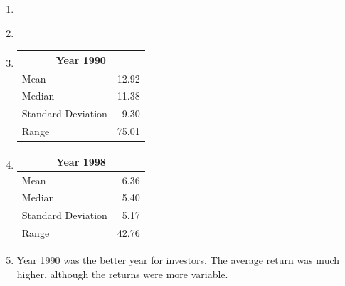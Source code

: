 \documentclass[a4paper,oneside]{book}
\begin{document}
\begin{enumerate}

%
%
%

\item ~

\vspace{-4em}
\begin{center}
\end{center}

\item ~

\vspace{-4em}
\begin{center}
\end{center}

\item 
\begin{tabular}{lr}
\hline
\multicolumn{2}{c}{Year 1990} \\
\hline
Mean               & 12.92 \\
Median             & 11.38 \\
Standard Deviation &  9.30 \\
Range              & 75.01 \\
\hline
\end{tabular}


\item 
\begin{tabular}{lr}
\hline
\multicolumn{2}{c}{Year 1998} \\
\hline
Mean                   &   6.36 \\
Median                 &   5.40 \\
Standard Deviation     &   5.17 \\
Range                  &  42.76 \\
\hline
\end{tabular}


\item Year 1990 was the better year for investors. The average return
  was much higher, although the returns were more variable.
\end{enumerate}
\end{document}
